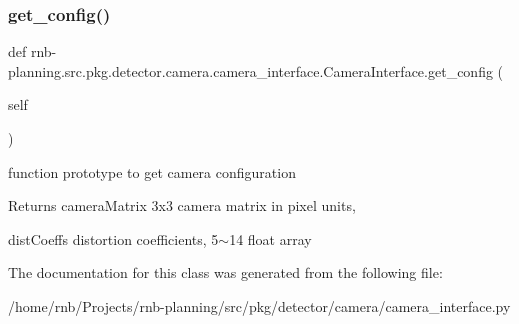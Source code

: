 \subsubsection{\texorpdfstring{get\+\_\+config()}{get\_config()}}
{\footnotesize\ttfamily def rnb-\/planning.\+src.\+pkg.\+detector.\+camera.\+camera\+\_\+interface.\+Camera\+Interface.\+get\+\_\+config (\begin{DoxyParamCaption}\item[{}]{self }\end{DoxyParamCaption})}



function prototype to get camera configuration 

\begin{DoxyReturn}{Returns}
camera\+Matrix 3x3 camera matrix in pixel units, 

dist\+Coeffs distortion coefficients, 5$\sim$14 float array 
\end{DoxyReturn}


The documentation for this class was generated from the following file\+:\begin{DoxyCompactItemize}
\item 
/home/rnb/\+Projects/rnb-\/planning/src/pkg/detector/camera/camera\+\_\+interface.\+py\end{DoxyCompactItemize}
